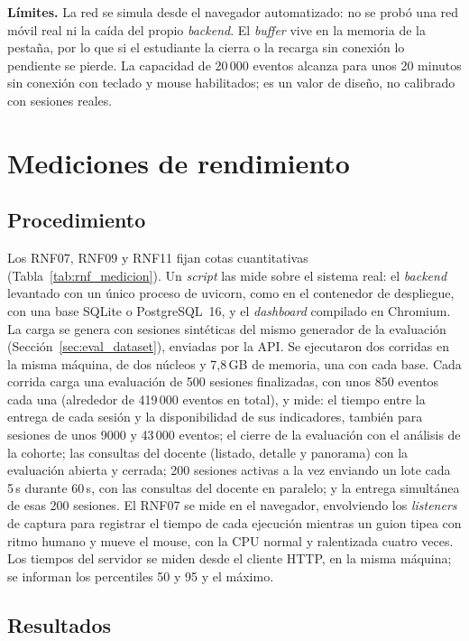 \textbf{Límites.} La red se simula desde el navegador automatizado: no se probó una red móvil real ni la caída del propio \textit{backend}. El \textit{buffer} vive en la memoria de la pestaña, por lo que si el estudiante la cierra o la recarga sin conexión lo pendiente se pierde. La capacidad de 20\,000 eventos alcanza para unos 20 minutos sin conexión con teclado y mouse habilitados; es un valor de diseño, no calibrado con sesiones reales.

\section{Mediciones de rendimiento}
\label{sec:eval_rnf}

\subsection{Procedimiento}

Los RNF07, RNF09 y RNF11 fijan cotas cuantitativas (Tabla~\ref{tab:rnf_medicion}). Un \textit{script} las mide sobre el sistema real: el \textit{backend} levantado con un único proceso de uvicorn, como en el contenedor de despliegue, con una base SQLite o PostgreSQL~16, y el \textit{dashboard} compilado en Chromium. La carga se genera con sesiones sintéticas del mismo generador de la evaluación (Sección~\ref{sec:eval_dataset}), enviadas por la API. Se ejecutaron dos corridas en la misma máquina, de dos núcleos y 7,8\,GB de memoria, una con cada base. Cada corrida carga una evaluación de 500 sesiones finalizadas, con unos 850 eventos cada una (alrededor de 419\,000 eventos en total), y mide: el tiempo entre la entrega de cada sesión y la disponibilidad de sus indicadores, también para sesiones de unos 9000 y 43\,000 eventos; el cierre de la evaluación con el análisis de la cohorte; las consultas del docente (listado, detalle y panorama) con la evaluación abierta y cerrada; 200 sesiones activas a la vez enviando un lote cada 5\,s durante 60\,s, con las consultas del docente en paralelo; y la entrega simultánea de esas 200 sesiones. El RNF07 se mide en el navegador, envolviendo los \textit{listeners} de captura para registrar el tiempo de cada ejecución mientras un guion tipea con ritmo humano y mueve el mouse, con la CPU normal y ralentizada cuatro veces. Los tiempos del servidor se miden desde el cliente HTTP, en la misma máquina; se informan los percentiles 50 y 95 y el máximo.

\subsection{Resultados}


